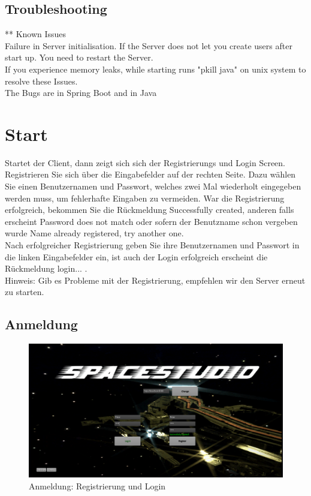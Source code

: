 \documentclass[fontsize=12pt,paper=a4,twoside]{scrartcl}
\begin{document}
\subsection{Troubleshooting}
** Known Issues\\
Failure in Server initialisation. If the Server does not let you create users after start up. You need to restart the Server.\\
If you experience memory leaks, while starting runs "pkill java" on unix system to resolve these Issues.\\
The Bugs are in Spring Boot and in Java\\



\section{Start}

Startet der Client, dann zeigt sich sich der Registrierungs und Login Screen.
Registrieren Sie sich über die Eingabefelder auf der rechten Seite. Dazu wählen Sie einen Benutzernamen und Passwort, welches zwei Mal wiederholt eingegeben werden muss, um fehlerhafte Eingaben zu vermeiden.
War die Registrierung erfolgreich, bekommen Sie die Rückmeldung Successfully created, anderen falls erscheint Password does not match oder sofern der Benutzname schon vergeben wurde Name already
registered, try another one.\\
Nach erfolgreicher Registrierung geben Sie ihre Benutzernamen und Passwort in die linken Eingabefelder ein, ist auch der Login erfolgreich erscheint die Rückmeldung login... .\\

Hinweis: Gib es Probleme mit der Registrierung, empfehlen wir den Server erneut zu starten.

\subsection{Anmeldung}
\begin{figure}[htp]
\centering
	\includegraphics[width=1.00\linewidth]{pics/StartScreen01.png}
	\caption{Anmeldung: Registrierung und Login}
	\label{fig1}
\end{figure}
\end{document}
